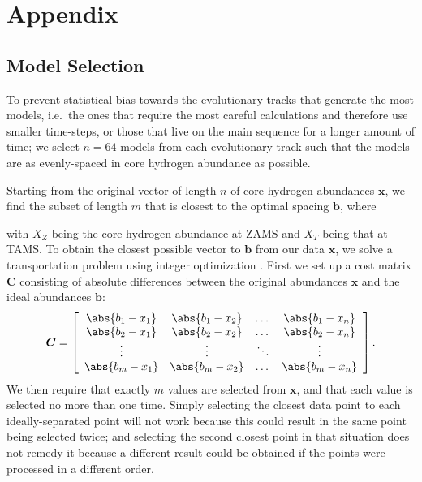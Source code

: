 \section{Appendix}
\subsection{Model Selection}
\label{sec:selection}
To prevent statistical bias towards the evolutionary tracks that generate the most models, i.e.\ the ones that require the most careful calculations and therefore use smaller time-steps, or those that live on the main sequence for a longer amount of time; we select ${n=64}$ models from each evolutionary track such that the models are as evenly-spaced in core hydrogen abundance as possible. 

Starting from the original vector of length $n$ of core hydrogen abundances $\mathbf x$, we find the subset of length $m$ that is closest to the optimal spacing $\mathbf b$, where
\iffalse
\begin{equation}
  \mathbf b = \left[
    X_T, 
    \ldots, 
    \frac{(m-i)\cdot X_T + X_Z}{m-1}, 
    \ldots, 
    X_Z
  \right],
  \qquad i=(m-1),\ldots,2
\end{equation}
\fi
with $X_Z$ being the core hydrogen abundance at ZAMS and $X_T$ being that at TAMS. To obtain the closest possible vector to $\mathbf b$ from our data $\mathbf x$, we solve a transportation problem using integer optimization \citep{23145595}. First we set up a cost matrix $\boldsymbol{C}$ consisting of absolute differences between the original abundances $\mathbf x$ and the ideal abundances $\mathbf b$:
\begin{equation} 
  \boldsymbol{C} = \left[
  \begin{array}{cccc}
    \abs{b_1-x_1} & \abs{b_1-x_2} & \dots & \abs{b_1-x_n} \\
    \abs{b_2-x_1} & \abs{b_2-x_2} & \dots & \abs{b_2-x_n} \\
    \vdots & \vdots & \ddots & \vdots \\
    \abs{b_m-x_1} & \abs{b_m-x_2} & \dots & \abs{b_m-x_n}
  \end{array} \right].
\end{equation}
We then require that exactly $m$ values are selected from $\mathbf x$, and that each value is selected no more than one time. Simply selecting the closest data point to each ideally-separated point will not work because this could result in the same point being selected twice; and selecting the second closest point in that situation does not remedy it because a different result could be obtained if the points were processed in a different order. 


